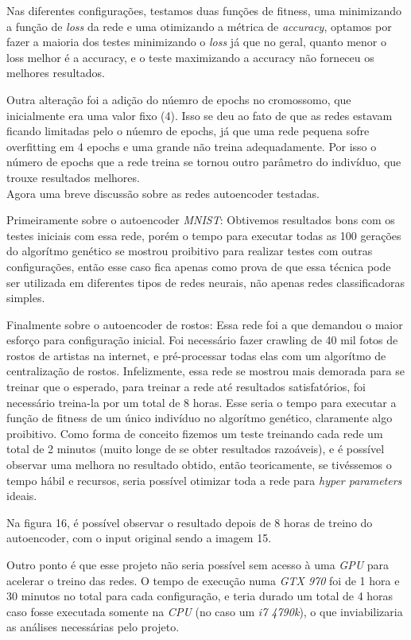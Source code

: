 \documentclass[twoside,conference,a4paper]{IEEEtran}
\begin{document}
Nas diferentes configurações, testamos duas funções de fitness, uma minimizando a função de \emph{loss} da rede e uma otimizando a métrica de \emph{accuracy}, optamos por fazer a maioria dos testes minimizando o \emph{loss} já que no geral, quanto menor o loss melhor é a accuracy, e o teste maximizando a accuracy não forneceu os melhores resultados.

Outra alteração foi a adição do núemro de epochs no cromossomo, que inicialmente era uma valor fixo (4). Isso se deu ao fato de que as redes estavam ficando limitadas pelo o núemro de epochs, já que uma rede pequena sofre overfitting em 4 epochs e uma grande não treina adequadamente. Por isso o número de epochs que a rede treina se tornou outro parâmetro do indivíduo, que trouxe resultados melhores. \\

Agora uma breve discussão sobre as redes autoencoder testadas. 

Primeiramente sobre o autoencoder \emph{MNIST}: Obtivemos resultados bons com os testes iniciais com essa rede, porém o tempo para executar todas as 100 gerações do algorítmo genético se mostrou proibitivo para realizar testes com outras configurações, então esse caso fica apenas como prova de que essa técnica pode ser utilizada em diferentes tipos de redes neurais, não apenas redes classificadoras simples.

Finalmente sobre o autoencoder de rostos: Essa rede foi a que demandou o maior esforço para configuração inicial. Foi necessário fazer crawling de 40 mil fotos de rostos de artistas na internet, e pré-processar todas elas com um algorítmo de centralização de rostos. Infelizmente, essa rede se mostrou mais demorada para se treinar que o esperado, para treinar a rede até resultados satisfatórios, foi necessário treina-la por um total de 8 horas. Esse seria o tempo para executar a função de fitness de um único indivíduo no algorítmo genético, claramente algo proibitivo. Como forma de conceito fizemos um teste treinando cada rede um total de 2 minutos (muito longe de se obter resultados razoáveis), e é possível observar uma melhora no resultado obtido, então teoricamente, se tivéssemos o tempo hábil e recursos, seria possível otimizar toda a rede para \emph{hyper parameters} ideais.

Na figura 16, é possível observar o resultado depois de 8 horas de treino do autoencoder, com o input original sendo a imagem 15.


Outro ponto é que esse projeto não seria possível sem acesso à uma \emph{GPU} para acelerar o treino das redes. O tempo de execução numa \emph{GTX 970} foi de 1 hora e 30 minutos no total para cada configuração, e teria durado um total de 4 horas caso fosse executada somente na \emph{CPU} (no caso um \emph{i7 4790k}), o que inviabilizaria as análises necessárias pelo projeto.
\end{document}
